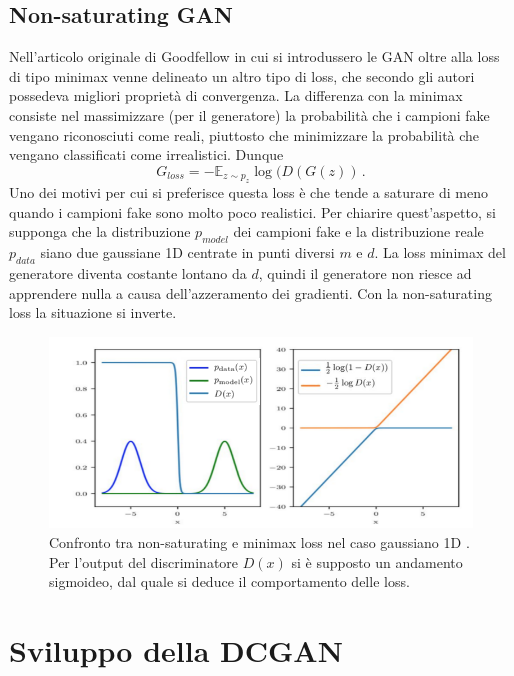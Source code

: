 \documentclass[Lau, noexaminfo, oneside]{sapthesis} %
\begin{document}
\section{Non-saturating GAN}
\label{Non-saturating GAN}
Nell'articolo originale di Goodfellow\cite{goodfellowgan} in cui si introdussero le GAN oltre alla loss di tipo minimax venne delineato un altro tipo di loss, che secondo gli autori possedeva migliori proprietà di convergenza.
La differenza con la minimax consiste nel massimizzare (per il generatore) la probabilità che i campioni fake vengano riconosciuti come reali, piuttosto che minimizzare la probabilità che vengano classificati come irrealistici. Dunque 
\begin{equation}
G_{loss} = - \mathbb{E}_{z \sim p_z} \log(D(G(z)) \,.
\end{equation}
Uno dei motivi per cui si preferisce questa loss è che tende a saturare di meno quando i campioni fake sono molto poco realistici. Per chiarire quest'aspetto, si supponga che la distribuzione $p_{model}$ dei campioni fake e la distribuzione reale $p_{data}$ siano due gaussiane 1D centrate in punti diversi $m$ e $d$. La loss minimax del generatore diventa costante lontano da $d$, quindi il generatore non riesce ad apprendere nulla a causa dell'azzeramento dei gradienti. Con la non-saturating loss la situazione si inverte.
\begin{figure}[H]
\includegraphics[scale=0.5]{non-saturating-GAN.png}
\centering
\caption{Confronto tra non-saturating e minimax loss nel caso gaussiano 1D \cite{manypathsgan}. Per l'output del discriminatore $D(x)$ si è supposto un andamento sigmoideo, dal quale si deduce il comportamento delle loss.}
\end{figure}
\chapter{Sviluppo della DCGAN}
\end{document}
